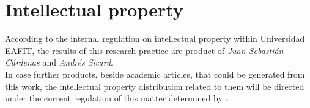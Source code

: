 \documentclass[11pt,letterpaper]{article}
\begin{document}
\section{Intellectual property}

According to the internal regulation on intellectual property within Universidad EAFIT, the results of this research practice are product of \emph{Juan Sebastián Cárdenas} and \emph{Andrés Sicard}.\\

In case further products, beside academic articles, that could be generated from this work, the intellectual property distribution related to them will be directed under the current regulation of this matter determined by \cite{reglamento2017}.




\end{document}

